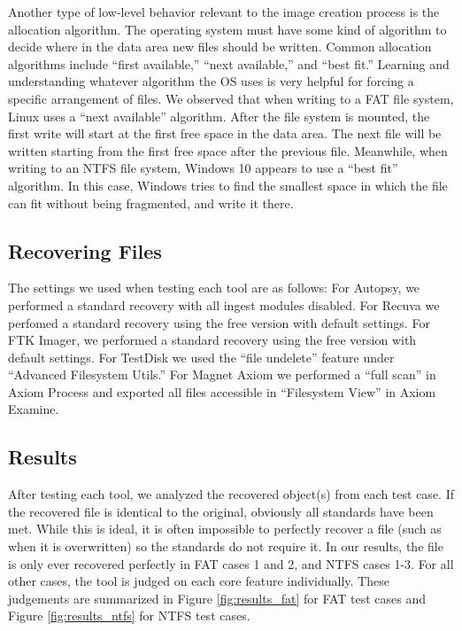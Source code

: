 Another type of low-level behavior relevant to the image creation process is the allocation algorithm. The operating system must have some kind of algorithm to decide where in the data area new files should be written. Common allocation algorithms include ``first available,'' ``next available,'' and ``best fit.''
Learning and understanding whatever algorithm the OS uses is very helpful for forcing a specific arrangement of files. We observed that when writing to a FAT file system, Linux uses a ``next available'' algorithm. After the file system is mounted, the first write will start at the first free space in the data area. The next file will be written starting from the first free space after the previous file.
Meanwhile, when writing to an NTFS file system, Windows 10 appears to use a ``best fit'' algorithm. In this case, Windows tries to find the smallest space in which the file can fit without being fragmented, and write it there.


\subsection{Recovering Files}

The settings we used when testing each tool are as follows:
For Autopsy, we performed a standard recovery with all ingest modules disabled.
For Recuva we perfomed a standard recovery using the free version with default settings.
For FTK Imager, we performed a standard recovery using the free version with default settings.
For TestDisk we used the ``file undelete'' feature under ``Advanced Filesystem Utils.''
For Magnet Axiom we performed a ``full scan'' in Axiom Process and exported all files accessible in ``Filesystem View'' in Axiom Examine.

\subsection{Results}

After testing each tool, we analyzed the recovered object(s) from each test case. 
If the recovered file is identical to the original, obviously all standards have been met. 
While this is ideal, it is often impossible to perfectly recover a file (such as when it is overwritten) so the standards do not require it. 
In our results, the file is only ever recovered perfectly in FAT cases 1 and 2, and NTFS cases 1-3. 
For all other cases, the tool is judged on each core feature individually. 
These judgements are summarized in Figure \ref{fig:results_fat} for FAT test cases and Figure \ref{fig:results_ntfs} for NTFS test cases.

